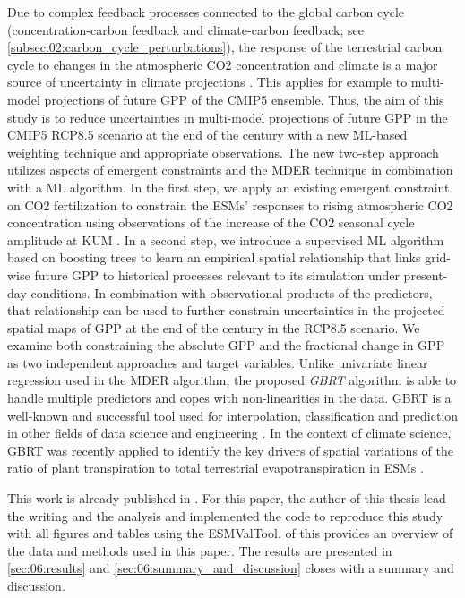 Due to complex feedback processes connected to the global carbon cycle
(concentration-carbon feedback and climate-carbon feedback; see
\cref{subsec:02:carbon_cycle_perturbations}), the response of the terrestrial
carbon cycle to changes in the atmospheric \ac{CO2} concentration and climate
is a major source of uncertainty in climate projections \autocite{Bodman2013,
  Booth2012, Collins2013}. This applies for example to multi-model projections
of future \ac{GPP} of the \acs{CMIP}5 ensemble. Thus, the aim of this study is
to reduce uncertainties in multi-model projections of future \ac{GPP} in the
\acs{CMIP}5 \acs{RCP}8.5 scenario at the end of the  century with a new
\ac{ML}-based weighting technique and appropriate observations. The new
two-step approach utilizes aspects of emergent constraints and the \ac{MDER}
technique in combination with a \ac{ML} algorithm. In the first step, we apply
an existing emergent constraint on \ac{CO2} fertilization \autocite{Wenzel2016}
to constrain the \acp{ESM}' responses to rising atmospheric \ac{CO2}
concentration using observations of the increase of the \ac{CO2} seasonal cycle
amplitude at \ac{KUM} \autocite{Keeling2005}. In a second step, we introduce a
supervised \ac{ML} algorithm based on boosting trees \autocite{Friedman2001} to
learn an empirical spatial relationship that links grid-wise future \ac{GPP} to
historical processes relevant to its simulation under present-day conditions.
In combination with observational products of the predictors, that relationship
can be used to further constrain uncertainties in the projected spatial maps of
\ac{GPP} at the end of the  century in the \acs{RCP}8.5 scenario. We
examine both constraining the absolute \ac{GPP} and the fractional change in
\ac{GPP} as two independent approaches and target variables. Unlike univariate
linear regression used in the \ac{MDER} algorithm, the proposed
\emph{\ac{GBRT}} algorithm is able to handle multiple predictors and copes with
non-linearities in the data. \Ac{GBRT} is a well-known and successful tool used
for interpolation, classification and prediction in other fields of data
science and engineering \autocite{Death2007, Elith2008}. In the context of
climate science, \ac{GBRT} was recently applied to identify the key drivers of
spatial variations of the ratio of plant transpiration to total terrestrial
evapotranspiration in \acp{ESM} \autocite{Lian2018}.

This work is already published in \textcite{Schlund2020}. For this paper, the
author of this thesis lead the writing and the analysis and implemented the
code to reproduce this study with all figures and tables using the
\ac{ESMValTool}.  of this
 provides an overview of the data and methods used in
this paper. The results are presented in \cref{sec:06:results} and
\cref{sec:06:summary_and_discussion} closes with a summary and discussion.


